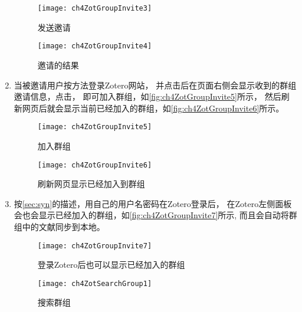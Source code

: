 \documentclass[cn,11pt,chinese]{elegantbook}
\begin{document}
\begin{enumerate}
	\begin{figure}[t]
		\begin{minipage}[b]{\dimexpr.5\textwidth-1em}
			\centering
			\texttt{[image: ch4ZotGroupInvite3]}
			\caption{发送邀请}
			\label{fig:ch4ZotGroupInvite3}
		\end{minipage}
		\begin{minipage}[b]{\dimexpr.5\textwidth-1em}
			\centering
			\texttt{[image: ch4ZotGroupInvite4]}
			\caption{邀请的结果}
			\label{fig:ch4ZotGroupInvite4}
		\end{minipage}
	\end{figure}
	\item 当被邀请用户按方法登录Zotero网站，
	并点击后在页面右侧会显示收到的群组邀请信息，点击，
	即可加入群组，如\autoref{fig:ch4ZotGroupInvite5}所示，
	然后刷新网页后就会显示当前已经加入的群组，如\autoref{fig:ch4ZotGroupInvite6}所示。
	\begin{figure}[t]
		\begin{minipage}[b]{\dimexpr.5\textwidth-1em}
			\centering
			\texttt{[image: ch4ZotGroupInvite5]}
			\caption{加入群组}
			\label{fig:ch4ZotGroupInvite5}
		\end{minipage}
		\begin{minipage}[b]{\dimexpr.5\textwidth-1em}
			\centering
			\texttt{[image: ch4ZotGroupInvite6]}
			\caption{刷新网页显示已经加入到群组}
			\label{fig:ch4ZotGroupInvite6}
		\end{minipage}
	\end{figure}
	\item 按\cref{sec:syn}的描述，用自己的用户名密码在Zotero登录后，
	在Zotero左侧面板会也会显示已经加入的群组，如\autoref{fig:ch4ZotGroupInvite7}所示,
	而且会自动将群组中的文献同步到本地。
	\begin{figure}[t]
			\begin{minipage}[b]{\dimexpr.5\textwidth-1em}
				\centering
				\texttt{[image: ch4ZotGroupInvite7]}
				\caption{登录Zotero后也可以显示已经加入的群组}
				\label{fig:ch4ZotGroupInvite7}
			\end{minipage}
			\begin{minipage}[b]{\dimexpr.5\textwidth-1em}
				\centering
				\texttt{[image: ch4ZotSearchGroup1]}
				\caption{搜索群组}
				\label{fig:ch4ZotSearchGroup1}
			\end{minipage}
	\end{figure}
	
\end{enumerate}
\end{document}
